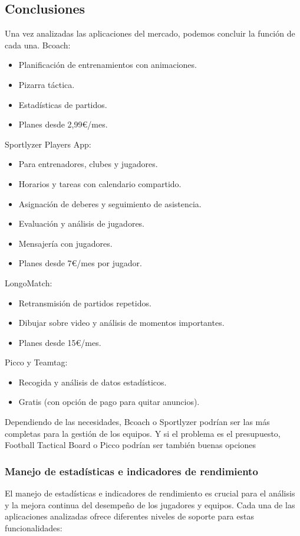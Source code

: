 \subsection{Conclusiones}
Una vez analizadas las aplicaciones del mercado, podemos concluir la función de cada una.
Bcoach:
\begin{itemize}
    \item Planificación de entrenamientos con animaciones.
    \item Pizarra táctica.
    \item Estadísticas de partidos.
    \item Planes desde 2,99€/mes.
\end{itemize}

Sportlyzer Players App:
\begin{itemize}
    \item Para entrenadores, clubes y jugadores.
    \item Horarios y tareas con calendario compartido.
    \item Asignación de deberes y seguimiento de asistencia.
    \item Evaluación y análisis de jugadores.
    \item Mensajería con jugadores.
    \item Planes desde 7€/mes por jugador.
\end{itemize}

LongoMatch:
\begin{itemize}
    \item Retransmisión de partidos repetidos.
    \item Dibujar sobre video y análisis de momentos importantes.
    \item Planes desde 15€/mes.
\end{itemize}

Picco y Teamtag:
\begin{itemize}
    \item Recogida y análisis de datos estadísticos.
    \item Gratis (con opción de pago para quitar anuncios).
\end{itemize}

Dependiendo de las necesidades, Bcoach o Sportlyzer podrían ser las más completas para la gestión de los equipos. Y si el problema es el presupuesto, Football Tactical Board o Picco podrían ser también buenas opciones

\subsubsection{Manejo de estadísticas e indicadores de rendimiento}
El manejo de estadísticas e indicadores de rendimiento es crucial para el análisis y la mejora continua del desempeño de los jugadores y equipos. Cada una de las aplicaciones analizadas ofrece diferentes niveles de soporte para estas funcionalidades:

